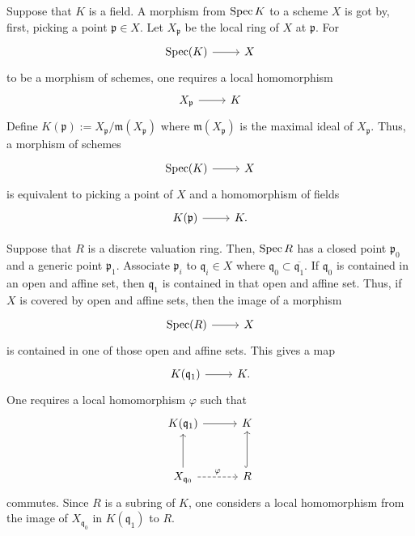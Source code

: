 \documentclass [11 pt, oneside] {article}
\begin{document}
Suppose that $K$ is a field. A morphism from $\operatorname{Spec} K$ to a scheme $X$ is got by, first, picking a point $\mathfrak{p}\in X$. Let $X_{\mathfrak{p}}$ be the local ring of $X$ at $\mathfrak{p}$. For \[
\begin{tikzcd}
\Spec(K)\ar[r]& X
\end{tikzcd}
\] 
 to be a morphism of schemes, one requires a local homomorphism 
 \[
\begin{tikzcd}
X_{\mathfrak{p}} \ar[r]& K
\end{tikzcd}
\] 
 Define $K(\mathfrak{p}):= X_{\mathfrak{p}}/\mathfrak{m}(X_{\mathfrak{p}})$ where  $\mathfrak{m}(X_{\mathfrak{p}})$ is the maximal ideal of $X_{\mathfrak{p}}$. Thus, a morphism of schemes 
 \[
\begin{tikzcd}
\Spec(K)\ar[r]& X
\end{tikzcd}
\] 
is equivalent to picking a point of $X$ and a homomorphism of fields 
\[
\begin{tikzcd}
K(\mathfrak{p})\ar[r]&K.
\end{tikzcd}
\] 

Suppose that $R$ is a discrete valuation ring. Then, $\operatorname{Spec} R$ has a closed point $\mathfrak{p}_0$ and a generic point $\mathfrak{p}_1$. Associate $\mathfrak{p}_i$ to $\mathfrak{q}_i\in X$ where $\mathfrak{q}_0\subset \overline{\mathfrak{q}_1}$. If $\mathfrak{q}_0$ is contained in an open and affine set, then $\mathfrak{q}_1$ is contained in that open and affine set. Thus, if $X$ is covered by open and affine sets, then the image of a morphism 
\[
\begin{tikzcd}
\Spec(R)\ar[r]&X
\end{tikzcd}
\] 
is contained in one of those open and affine sets. This gives a map 
\[
\begin{tikzcd}
K(\mathfrak{q}_1) \ar[r]&K.
\end{tikzcd}
\] 
One requires a local homomorphism $\varphi$ such that
\[
\begin{tikzcd}[column sep = 3 em, row sep = 3 em]
	K(\mathfrak{q}_1)\ar[r]&K\\ X_{\mathfrak{q}_0} \ar[u] \ar[r,dashed,"\varphi"] &R\ar[u,hookrightarrow]
\end{tikzcd}
\]
commutes. Since $R$ is a subring of $K$, one considers a local homomorphism from the image of $X_{\mathfrak{q}_0}$ in $K(\mathfrak{q}_1)$ to $R$.
\end{document}
